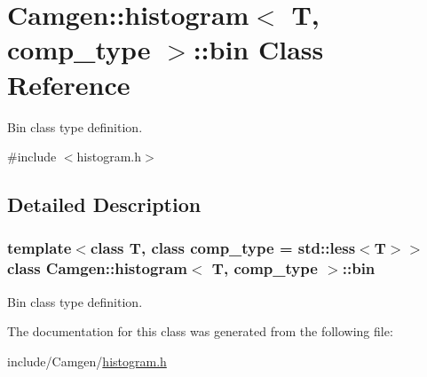 \hypertarget{a00028}{\section{Camgen\-:\-:histogram$<$ T, comp\-\_\-type $>$\-:\-:bin Class Reference}
\label{a00028}
}


Bin class type definition.  




{\ttfamily \#include $<$histogram.\-h$>$}



\subsection{Detailed Description}
\subsubsection*{template$<$class T, class comp\-\_\-type = std\-::less$<$\-T$>$$>$class Camgen\-::histogram$<$ T, comp\-\_\-type $>$\-::bin}

Bin class type definition. 

The documentation for this class was generated from the following file\-:\begin{DoxyCompactItemize}
\item 
include/\-Camgen/\hyperlink{a00645}{histogram.\-h}\end{DoxyCompactItemize}
